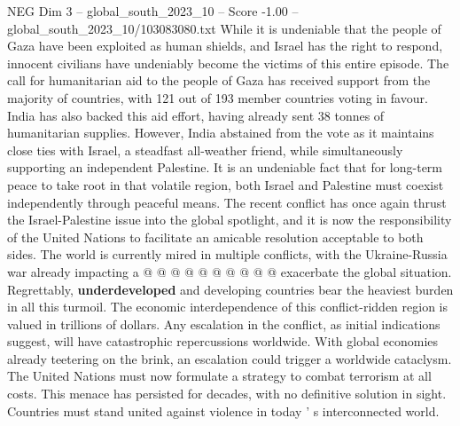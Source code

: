 \begin{textsample}{NEG Dim 3 – global\_south\_2023\_10 – Score -1.00 – global\_south\_2023\_10/103083080.txt}
While it is undeniable that the people of Gaza have been exploited as human shields, and Israel has the right to respond, innocent civilians have undeniably become the victims of this entire episode.
The call for humanitarian aid to the people of Gaza has received support from the majority of countries, with 121 out of 193 member countries voting in favour.
India has also backed this aid effort, having already sent 38 tonnes of humanitarian supplies.
However, India abstained from the vote as it maintains close ties with Israel, a steadfast all-weather friend, while simultaneously supporting an independent Palestine.
It is an undeniable fact that for long-term peace to take root in that volatile region, both Israel and Palestine must coexist independently through peaceful means.
The recent conflict has once again thrust the Israel-Palestine issue into the global spotlight, and it is now the responsibility of the United Nations to facilitate an amicable resolution acceptable to both sides.
The world is currently mired in multiple conflicts, with the Ukraine-Russia war already impacting a @ @ @ @ @ @ @ @ @ @ exacerbate the global situation.
Regrettably, \textbf{underdeveloped} and developing countries bear the heaviest burden in all this turmoil.
The economic interdependence of this conflict-ridden region is valued in trillions of dollars.
Any escalation in the conflict, as initial indications suggest, will have catastrophic repercussions worldwide.
With global economies already teetering on the brink, an escalation could trigger a worldwide cataclysm.
The United Nations must now formulate a strategy to combat terrorism at all costs.
This menace has persisted for decades, with no definitive solution in sight.
Countries must stand united against violence in today ' s interconnected world.

\end{textsample}
